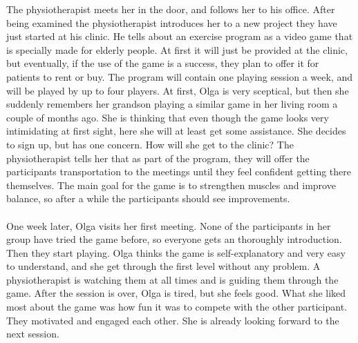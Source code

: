 The physiotherapist meets her in the door, and follows her to his office. After being examined the physiotherapist introduces her to a new project they have just started at his clinic. He tells about an exercise program as a video game that is specially made for elderly people. At first it will just be provided at the clinic, but eventually, if the use of the game is a success, they plan to offer it for patients to rent or buy. The program will contain one playing session a week, and will be played by up to four players. At first, Olga is very sceptical, but then she suddenly remembers her grandson playing a similar game in her living room a couple of months ago. She is thinking that even though the game looks very intimidating at first sight, here she will at least get some assistance. She decides to sign up, but has one concern. How will she get to the clinic? The physiotherapist tells her that as part of the program, they will offer the participants transportation to the meetings until they feel confident getting there themselves. The main goal for the game is to strengthen muscles and improve balance, so after a while the participants should see improvements. \\ \\
One week later, Olga visits her first meeting. None of the participants in her group have tried the game before, so everyone gets an thoroughly introduction. Then they start playing. Olga thinks the game is self-explanatory and very easy to understand, and she get through the first level without any problem. A physiotherapist is watching them at all times and is guiding them through the game. After the session is over, Olga is tired, but she feels good. What she liked most about the game was how fun it was to compete with the other participant. They motivated and engaged each other. She is already looking forward to the next session. 

